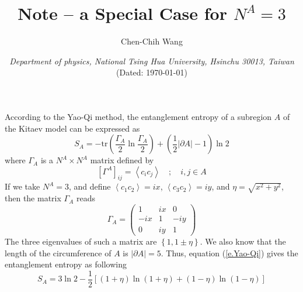 \documentclass[12font]{article}
\title{\textbf{ Note -- a Special Case for $N^A=3$ }}
\author{Chen-Chih Wang  }
\date{\textit{Department of physics, National Tsing Hua University, Hsinchu 30013, Taiwan} \\ (Dated: \today)}
\theoremstyle{definition}
\newcommand{\anglelr}[1]{\left\langle #1 \right\rangle}
\newcommand{\lr}[1]{\left(  #1  \right)}
\newcommand{\lrm}[1]{\left[  #1  \right]}
\newcommand{\lrg}[1]{\left\{  #1  \right\}}
\newcommand{\abs}[1]{\left|  #1  \right|}
\newcommand{\de}{\partial}
\newcommand{\mrm}[1]{\mathrm{#1}}
\newcommand{\tr}{\mrm{tr}}
\begin{document}
\renewcommand\qedsymbol{$\blacksquare$}
\maketitle
According to the Yao-Qi method, the entanglement entropy of a subregion $A$ of the Kitaev model can be expressed as
\begin{equation}\label{e.Yao-Qi}
  S_A = -\tr\lr{\frac{\Gamma_A}{2}\ln\frac{\Gamma_A}{2}} + \lr{\frac{1}{2}\abs{\de A} - 1}\ln 2
\end{equation}
where $\Gamma_A$ is a $N^A\times N^A$ matrix defined by
\[
[\Gamma^A]_{ij} = \anglelr{c_ic_j}\quad;\quad i,j\in A
\]
If we take $N^A=3$, and define $\anglelr{c_1c_2}=ix$, $\anglelr{c_3c_2}=iy$, and $\eta=\sqrt{x^2+y^2}$, then the matrix $\Gamma_A$ reads
\[
\Gamma_A = \begin{pmatrix}
             1 & ix & 0 \\
             -ix & 1 & -iy \\
             0 & iy & 1 
           \end{pmatrix}
\]
The three eigenvalues of such a matrix are $\lrg{1,1\pm\eta}$. We also know that the length of the circumference of $A$ is $\abs{\de A}=5$. Thus,  equation (\ref{e.Yao-Qi}) gives the entanglement entropy as following
\begin{equation}\label{e.result-Yao-Qi}
S_A = 3\ln2 - \frac{1}{2}\lrm{\lr{1+\eta}\ln\lr{1+\eta} + \lr{1-\eta}\ln\lr{1-\eta}}
\end{equation}
\end{document}
